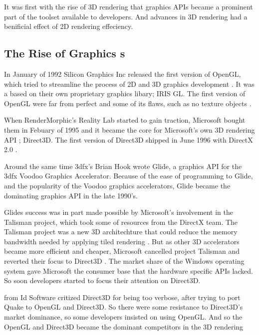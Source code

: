 It was first with the rise of 3D rendering that graphics \glspl{API} became a prominent part of the toolset available to developers.
And advances in 3D rendering had a benificial effect of 2D rendering effeciency.


\subsection{The Rise of Graphics s} 

In January of 1992 Silicon Graphics Inc released the first version of OpenGL, which tried to streamline the process of 2D and 3D graphics development \cite{segal1994opengl}.
It was a based on their own proprietary graphics libary; \gls{IRIS GL}.
The first version of OpenGL were far from perfect and some of its flaws, such as no texture objects \cite{kronos????history}.

When RenderMorphic's Reality Lab started to gain traction, Microsoft bought them in Febuary of 1995 and it became the core for Microsoft's own 3D rendering \gls{API} \cite{1997crushed}; Direct3D.
The first version of Direct3D shipped in June 1996 with DirectX 2.0 \cite{wikipedia????directx}. 

Around the same time 3dfx's Brian Hook wrote Glide, a graphics API for the 3dfx Voodoo Graphics Accelerator.
Because of the ease of programming to Glide, and the popularity of the Voodoo graphics accelerators, Glide became the dominating graphics \gls{API} in the late 1990's.

Glides success was in part made possible by Microsoft's involvement in the Talisman project, which took some of resources from the DirectX team.
The Talisman project was a new 3D architechture that could reduce the memory bandwidth needed by applying tiled rendering \cite{torborg1996talisman}.
But as other 3D accelerators became more efficient and cheaper, Microsoft cancelled project Talisman and reverted their focus to Direct3D \cite{wikipedia????talisman}.
The market share of the Windows operating system gave Microsoft the consumer base that the hardware specific \glspl{API} lacked.
So soon developers started to focus their attention on Direct3D.

\citet{carmack1996plan} from Id Software critized Direct3D for being too verbose, after trying to port Quake to OpenGL and Direct3D.
So there were some resistance to Direct3D's market dominance, so some developers insisted on using OpenGL.
And so the OpenGL and Direct3D became the dominant competitors in the 3D rendering 

